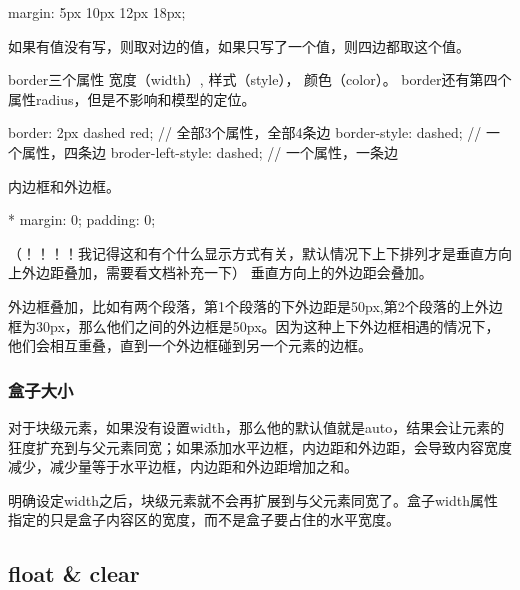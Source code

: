 \begin{CSS}[上 右 下 左]
{margin: 5px 10px 12px 18px;}
\end{CSS}

如果有值没有写，则取对边的值，如果只写了一个值，则四边都取这个值。


border三个属性 宽度（width）, 样式（style）， 颜色（color）。 border还有第四个属性radius，但是不影响和模型的定位。

\begin{CSS}[三个粒度]
{border: 2px dashed red;} // 全部3个属性，全部4条边
{border-style: dashed;} // 一个属性，四条边
{broder-left-style: dashed;} // 一个属性，一条边
\end{CSS}

内边框和外边框。


\begin{CSS}
* {margin: 0; padding: 0;}
\end{CSS}


（！！！！我记得这和有个什么显示方式有关，默认情况下上下排列才是垂直方向上外边距叠加，需要看文档补充一下）
垂直方向上的外边距会叠加。

外边框叠加，比如有两个段落，第1个段落的下外边距是50px,第2个段落的上外边框为30px，那么他们之间的外边框是50px。因为这种上下外边框相遇的情况下，他们会相互重叠，直到一个外边框碰到另一个元素的边框。

\subsubsection{盒子大小}

对于块级元素，如果没有设置width，那么他的默认值就是auto，结果会让元素的狂度扩充到与父元素同宽；如果添加水平边框，内边距和外边距，会导致内容宽度减少，减少量等于水平边框，内边距和外边距增加之和。

明确设定width之后，块级元素就不会再扩展到与父元素同宽了。盒子width属性指定的只是盒子内容区的宽度，而不是盒子要占住的水平宽度。


\subsection{float \& clear}

